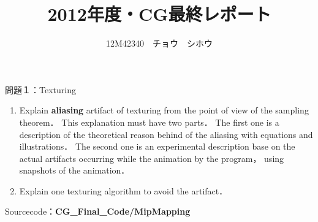 \documentclass[a4paper,11pt]{jsarticle}
\title{2012年度・CG最終レポート}
\author{12M42340　チョウ　シホウ}
\numberwithin{theorem}{section}  %
\numberwithin{equation}{section} %
\begin{document}
{}
\renewcommand{\thepart}{\arabic{part}}


\begin{itembox}[l]{問題１：Texturing}
\begin{enumerate}
\item
Explain {\bf aliasing} artifact of texturing from the point of view of the sampling theorem． This explanation must
have two parts． The first one is a description of the theoretical reason behind of the aliasing with equations and
illustrations． The second one is an experimental description base on the actual artifacts occurring while the animation
by the program， using snapshots of the animation．
\item Explain one texturing algorithm to avoid the artifact．
\end{enumerate}
\end{itembox}
Sourcecode：{\bf CG\_Final\_Code/MipMapping}
\end{document}
